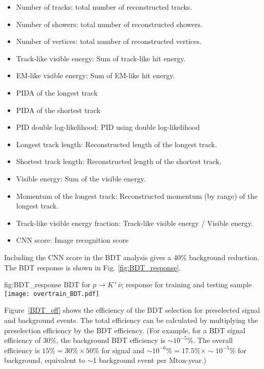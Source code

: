   \begin{itemize}
  \item Number of tracks: total number of reconstructed tracks. 
  \item Number of showers: total number of reconstructed showers.
  \item Number of vertices: total number of reconstructed vertices.
  \item Track-like visible energy: Sum of track-like hit energy.
  \item EM-like visible energy: Sum of EM-like hit energy.
  \item PIDA of the longest track
  \item PIDA of the shortest track
  \item PID double log-likelihood: PID using double log-likelihood 
  \item Longest track length: Reconstructed length of the longest track.
  \item Shortest track length: Reconstructed length of the shortest track.
  \item Visible energy: Sum of the visible energy.
  \item Momentum of the longest track: Reconstructed momentum (by range) of the longest track.
  \item Track-like visible energy fraction: Track-like visible energy / Visible energy.
  \item CNN score: Image recognition score
  \end{itemize} 
 Including the CNN score in the BDT analysis gives a 40\% background reduction.
The BDT response is shown in Fig. \ref{fig:BDT_response}. 

\begin{dunefigure}
{fig:BDT_response}
{BDT for $p\rightarrow K^{+} \bar{\nu}$; response for training and testing sample}
\texttt{[image: overtrain\_BDT.pdf]}
\end{dunefigure} 

Figure~\ref{BDT_eff} shows the efficiency of the BDT selection for preselected signal and background events. The total efficiency can be calculated by multiplying the preselection efficiency by the BDT efficiency.  (For example, for a BDT signal efficiency of 30\%, the background BDT efficiency is $\sim 10^{-5}\%$.  The overall efficiency is $15\% = 30\% \times 50\%$ for signal and $\sim10^{-6} \% = 17.5\% \times \sim 10^{-5}\%$ for background, equivalent to $\sim$1 background event per Mton-year.)


